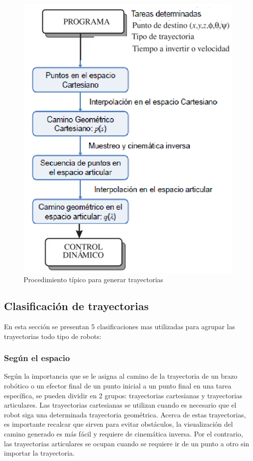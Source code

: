     \begin{figure}[htb]
        \centering
        \includegraphics[width=0.65\linewidth]{Main/Chapter4/Images4/cap4_tray_3.png}
        \caption{Procedimiento típico para generar trayectorias \cite{tray_utec}}
        \label{f:Cap4_tray_3}
    \end{figure}  
    
    

        \newpage

    \subsection{Clasificación de trayectorias}
        En esta sección se presentan 5 clasificaciones mas utilizadas para agrupar las trayectorias todo tipo de robots:
        
        \subsubsection{Según el espacio }
            Según la importancia que se le asigna al camino de la trayectoria de un brazo robótico o un efector final de un punto inicial a un punto final en una tarea específica, se pueden dividir en 2 grupos: trayectorias cartesianas y trayectorias articulares. Las trayectorias cartesianas se utilizan cuando es necesario que el robot siga una determinada trayectoria geométrica. Acerca de estas trayectorias, es importante recalcar que sirven para evitar obstáculos, la visualización del camino generado es más fácil y requiere de cinemática inversa. Por el contrario, las trayectorias articulares se ocupan cuando se requiere ir de un punto a otro sin importar la trayectoria. 
            
